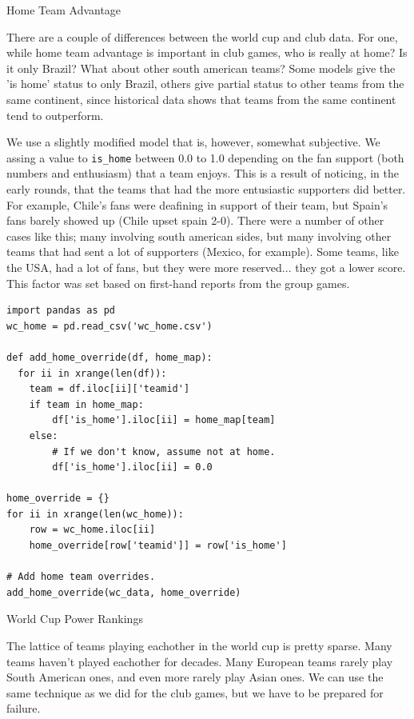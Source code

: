 \documentclass[12pt,fleqn]{article}\usepackage{common}
\begin{document}
Home Team Advantage

There are a couple of differences between the world cup and club data. For
one, while home team advantage is important in club games, who is really at
home? Is it only Brazil? What about other south american teams? Some models
give the 'is home' status to only Brazil, others give partial status to
other teams from the same continent, since historical data shows that teams
from the same continent tend to outperform.

We use a slightly modified model that is, however, somewhat subjective. We
assing a value to \verb!is_home! between 0.0 to 1.0 depending on the fan
support (both numbers and enthusiasm) that a team enjoys. This is a result
of noticing, in the early rounds, that the teams that had the more
entusiastic supporters did better. For example, Chile's fans were deafining
in support of their team, but Spain's fans barely showed up (Chile upset
spain 2-0). There were a number of other cases like this; many involving
south american sides, but many involving other teams that had sent a lot of
supporters (Mexico, for example). Some teams, like the USA, had a lot of
fans, but they were more reserved... they got a lower score. This factor
was set based on first-hand reports from the group games.

\begin{verbatim}
import pandas as pd
wc_home = pd.read_csv('wc_home.csv')

def add_home_override(df, home_map):
  for ii in xrange(len(df)):
    team = df.iloc[ii]['teamid']
    if team in home_map:
        df['is_home'].iloc[ii] = home_map[team]
    else:
        # If we don't know, assume not at home.
        df['is_home'].iloc[ii] = 0.0
        
home_override = {}
for ii in xrange(len(wc_home)):
    row = wc_home.iloc[ii]
    home_override[row['teamid']] = row['is_home']

# Add home team overrides.
add_home_override(wc_data, home_override)    
\end{verbatim}

World Cup Power Rankings

The lattice of teams playing eachother in the world cup is pretty
sparse. Many teams haven't played eachother for decades. Many European
teams rarely play South American ones, and even more rarely play Asian
ones. We can use the same technique as we did for the club games, but we
have to be prepared for failure.
\end{document}
